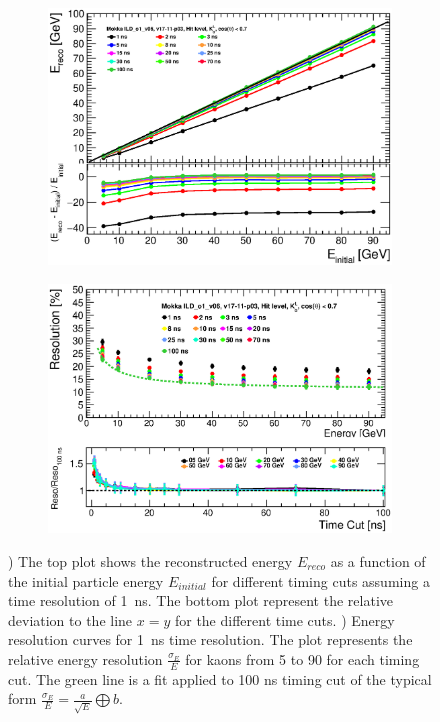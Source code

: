 \begin{figure}[htbp!]
  \centering
  \begin{subfigure}[t]{0.49\textwidth}
    \centering
    \includegraphics[width=1\linewidth]{../Thesis_Plots/ILD/Smearing_1ns/Plots/Linearity_TimeCuts_Smearing2.eps}
    \caption{} \label{fig:Lin1ns}
  \end{subfigure}
  \hfill
  \begin{subfigure}[t]{0.49\textwidth}
    \centering
    \includegraphics[width=1\linewidth]{../Thesis_Plots/ILD/Smearing_1ns/Plots/ShowerResoAbsolute_TimeCuts_Smearing2.eps}
    \caption{} \label{fig:Reso1ns}
  \end{subfigure}
  \caption{) The top plot shows the reconstructed energy $E_{reco}$ as a function of the initial particle energy $E_{initial}$ for different timing cuts assuming a time resolution of \SI{1}{\nano\second}. The bottom plot represent the relative deviation to the line $x=y$ for the different time cuts. ) Energy resolution curves for \SI{1}{\nano\second} time resolution. The plot represents the relative energy resolution $\frac{\sigma_{E}}{E}$ for kaons from 5 to 90 \GeV for each timing cut. The green line is a fit applied to 100 ns timing cut of the typical form $\frac{\sigma_{E}}{E} = \frac{a}{\sqrt{E}} \bigoplus b$.}
\end{figure}


